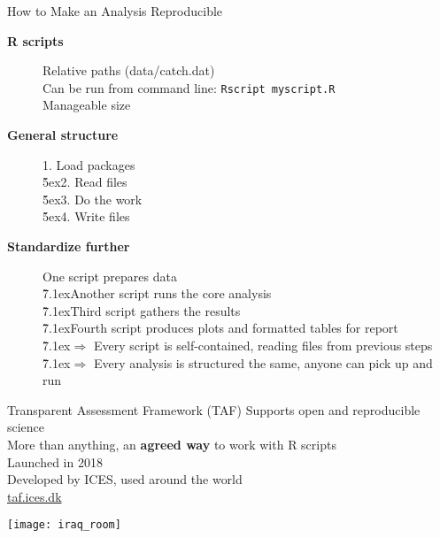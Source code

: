 \documentclass[aspectratio=169]{beamer}
\begin{document}
\begin{frame}{How to Make an Analysis Reproducible}\small
  \begin{description}
    \item[\bf R scripts] Relative paths (data/catch.dat)\\
    Can be run from command line: {\tt Rscript myscript.R}\\
    Manageable size\\[3ex]
    \item[\bf General structure] 1. Load packages\\
    \h{5ex}2. Read files\\
    \h{5ex}3. Do the work\\
    \h{5ex}4. Write files\\[3ex]
    \item[\bf Standardize further] One script prepares data\\
    \h{7.1ex}Another script runs the core analysis\\
    \h{7.1ex}Third script gathers the results\\
    \h{7.1ex}Fourth script produces plots and formatted tables for report\\
    \h{7.1ex}$\Rightarrow$ Every script is self-contained, reading files from
    previous steps\\
    \h{7.1ex}$\Rightarrow$ Every analysis is structured the same, anyone can
    pick up and run
  \end{description}
  \vspace{2ex}
\end{frame}


\begin{frame}{Transparent Assessment Framework (TAF)}
  Supports open and reproducible science\\[2.5ex]
  More than anything, an {\bf agreed way} to work with R scripts\\[2.5ex]
  Launched in 2018\\[2.5ex]
  Developed by ICES, used around the world\\[2.5ex]
  {\blue\href{https://taf.ices.dk}{taf.ices.dk}}\\[1ex]
\end{frame}


\begin{frame}
  \centering\texttt{[image: iraq\_room]}
\end{frame}
\end{document}

